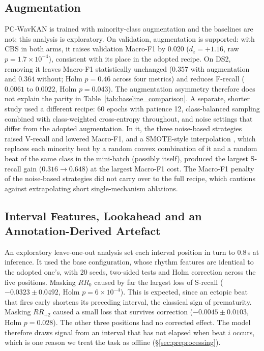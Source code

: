 \documentclass[preprint,12pt]{elsarticle}
\begin{document}
\subsection{Augmentation}
\label{sec:results_augmentation}
PC-WavKAN is trained with minority-class augmentation and the baselines are not; this analysis is exploratory. On validation, augmentation is supported: with CBS in both arms, it raises validation Macro-F1 by $0.020$ ($d_z = +1.16$, raw $p = 1.7\times10^{-4}$), consistent with its place in the adopted recipe. On DS2, removing it leaves Macro-F1 statistically unchanged ($0.357$ with augmentation and $0.364$ without; Holm $p = 0.46$ across four metrics) and reduces F-recall ($0.0061$ to $0.0022$, Holm $p = 0.043$). The augmentation asymmetry therefore does not explain the parity in Table~\ref{tab:baseline_comparison}. A separate, shorter study used a different recipe: 60 epochs with patience 12, class-balanced sampling combined with class-weighted cross-entropy throughout, and noise settings that differ from the adopted augmentation. In it, the three noise-based strategies raised V-recall and lowered Macro-F1, and a SMOTE-style interpolation \cite{chawla_smote_2002}, which replaces each minority beat by a random convex combination of it and a random beat of the same class in the mini-batch (possibly itself), produced the largest S-recall gain ($0.316 \rightarrow 0.648$) at the largest Macro-F1 cost. The Macro-F1 penalty of the noise-based strategies did not carry over to the full recipe, which cautions against extrapolating short single-mechanism ablations.

\subsection{Interval Features, Lookahead and an Annotation-Derived Artefact}
\label{sec:results_rr}
An exploratory leave-one-out analysis set each interval position in turn to 0.8\,s at inference. It used the base configuration, whose rhythm features are identical to the adopted one's, with 20 seeds, two-sided tests and Holm correction across the five positions. Masking $RR_0$ caused by far the largest loss of S-recall ($-0.0323\pm0.0492$, Holm $p = 6\times10^{-4}$). This is expected, since an ectopic beat that fires early shortens its preceding interval, the classical sign of prematurity. Masking $RR_{+2}$ caused a small loss that survives correction ($-0.0045\pm0.0103$, Holm $p = 0.028$). The other three positions had no corrected effect. The model therefore draws signal from an interval that has not elapsed when beat $i$ occurs, which is one reason we treat the task as offline (\S\ref{sec:preprocessing}).
\end{document}

